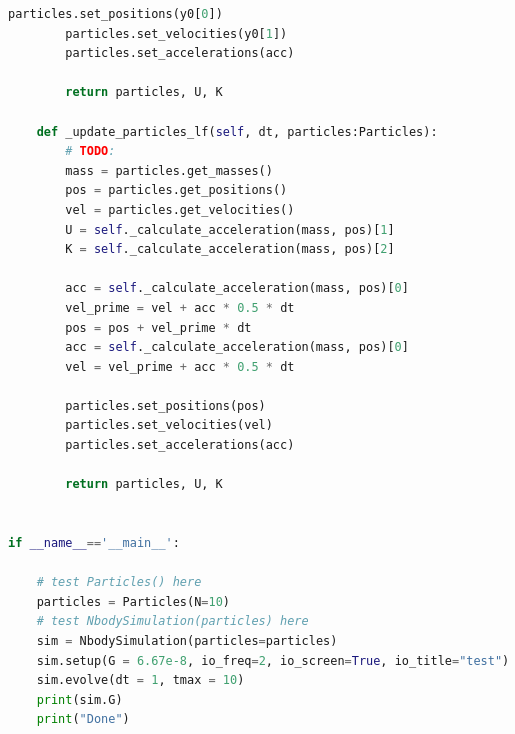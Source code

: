 \documentclass[12pt]{article}
\begin{document}
\begin{lstlisting}[language={Python}]
        particles.set_positions(y0[0])
        particles.set_velocities(y0[1])
        particles.set_accelerations(acc)
        
        return particles, U, K
    
    def _update_particles_lf(self, dt, particles:Particles):
        # TODO:
        mass = particles.get_masses()
        pos = particles.get_positions()
        vel = particles.get_velocities()
        U = self._calculate_acceleration(mass, pos)[1]
        K = self._calculate_acceleration(mass, pos)[2]
        
        acc = self._calculate_acceleration(mass, pos)[0]
        vel_prime = vel + acc * 0.5 * dt
        pos = pos + vel_prime * dt
        acc = self._calculate_acceleration(mass, pos)[0]
        vel = vel_prime + acc * 0.5 * dt
        
        particles.set_positions(pos)
        particles.set_velocities(vel)
        particles.set_accelerations(acc)
        
        return particles, U, K


if __name__=='__main__':

    # test Particles() here
    particles = Particles(N=10)
    # test NbodySimulation(particles) here
    sim = NbodySimulation(particles=particles)
    sim.setup(G = 6.67e-8, io_freq=2, io_screen=True, io_title="test")
    sim.evolve(dt = 1, tmax = 10)
    print(sim.G)
    print("Done")
        \end{lstlisting}
\end{document}

